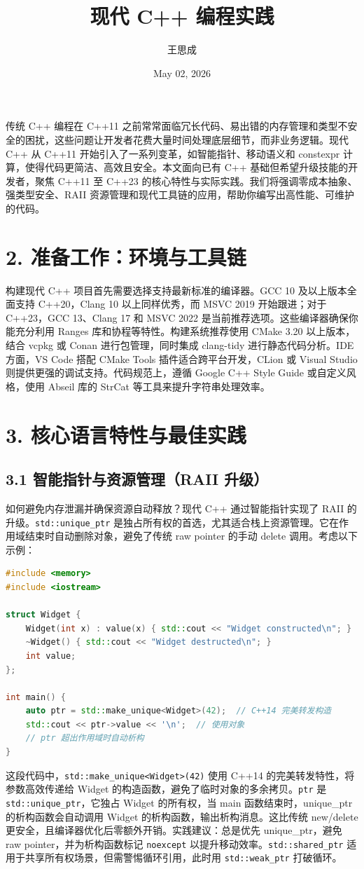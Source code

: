 \title{现代 C++ 编程实践}
\author{王思成}
\date{May 02, 2026}
\maketitle
传统 C++ 编程在 C++11 之前常常面临冗长代码、易出错的内存管理和类型不安全的困扰，这些问题让开发者花费大量时间处理底层细节，而非业务逻辑。现代 C++ 从 C++11 开始引入了一系列变革，如智能指针、移动语义和 constexpr 计算，使得代码更简洁、高效且安全。本文面向已有 C++ 基础但希望升级技能的开发者，聚焦 C++11 至 C++23 的核心特性与实际实践。我们将强调零成本抽象、强类型安全、RAII 资源管理和现代工具链的应用，帮助你编写出高性能、可维护的代码。\par
\chapter{2. 准备工作：环境与工具链}
构建现代 C++ 项目首先需要选择支持最新标准的编译器。GCC 10 及以上版本全面支持 C++20，Clang 10 以上同样优秀，而 MSVC 2019 开始跟进；对于 C++23，GCC 13、Clang 17 和 MSVC 2022 是当前推荐选项。这些编译器确保你能充分利用 Ranges 库和协程等特性。构建系统推荐使用 CMake 3.20 以上版本，结合 vcpkg 或 Conan 进行包管理，同时集成 clang-tidy 进行静态代码分析。IDE 方面，VS Code 搭配 CMake Tools 插件适合跨平台开发，CLion 或 Visual Studio 则提供更强的调试支持。代码规范上，遵循 Google C++ Style Guide 或自定义风格，使用 Abseil 库的 StrCat 等工具来提升字符串处理效率。\par
\chapter{3. 核心语言特性与最佳实践}
\section{3.1 智能指针与资源管理（RAII 升级）}
如何避免内存泄漏并确保资源自动释放？现代 C++ 通过智能指针实现了 RAII 的升级。\texttt{std::unique\_{}ptr} 是独占所有权的首选，尤其适合栈上资源管理。它在作用域结束时自动删除对象，避免了传统 raw pointer 的手动 delete 调用。考虑以下示例：\par
\begin{lstlisting}[language=cpp]
#include <memory>
#include <iostream>

struct Widget {
    Widget(int x) : value(x) { std::cout << "Widget constructed\n"; }
    ~Widget() { std::cout << "Widget destructed\n"; }
    int value;
};

int main() {
    auto ptr = std::make_unique<Widget>(42);  // C++14 完美转发构造
    std::cout << ptr->value << '\n';  // 使用对象
    // ptr 超出作用域时自动析构
}
\end{lstlisting}
这段代码中，\texttt{std::make\_{}unique<Widget>(42)} 使用 C++14 的完美转发特性，将参数高效传递给 Widget 的构造函数，避免了临时对象的多余拷贝。\texttt{ptr} 是 \texttt{std::unique\_{}ptr}，它独占 Widget 的所有权，当 main 函数结束时，unique\_{}ptr 的析构函数会自动调用 Widget 的析构函数，输出析构消息。这比传统 new/delete 更安全，且编译器优化后零额外开销。实践建议：总是优先 unique\_{}ptr，避免 raw pointer，并为析构函数标记 \texttt{noexcept} 以提升移动效率。\texttt{std::shared\_{}ptr} 适用于共享所有权场景，但需警惕循环引用，此时用 \texttt{std::weak\_{}ptr} 打破循环。\par
